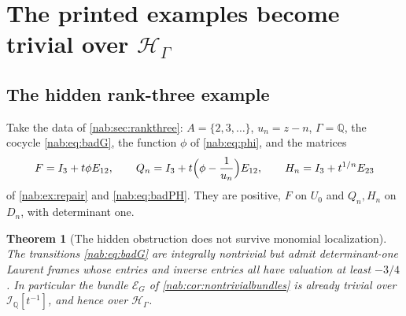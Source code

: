 \documentclass[11pt,letterpaper]{article}
\newtheorem{theorem}{Theorem}[section]
\theoremstyle{definition}
\theoremstyle{remark}
\newcommand{\Q}{\mathbb Q}
\newcommand{\HH}{\mathscr H_\Gamma}
\numberwithin{equation}{section}
\begin{document}
\section{The printed examples become trivial over \texorpdfstring{$\HH$}{H}}
\label{nab:pl:sec:printed}

\subsection{The hidden rank-three example}

Take the data of \cref{nab:sec:rankthree}: $A=\{2,3,\ldots\}$, $u_n=z-n$,
$\Gamma=\Q$, the cocycle \eqref{nab:eq:badG}, the function $\phi$ of
\eqref{nab:eq:phi}, and the matrices
\[
 F=I_3+t\phi E_{12},\qquad
 Q_n=I_3+t\Bigl(\phi-\frac1{u_n}\Bigr)E_{12},\qquad
 H_n=I_3+t^{1/n}E_{23}
\]
of \cref{nab:ex:repair} and \eqref{nab:eq:badPH}. They are positive, $F$ on
$U_0$ and $Q_n,H_n$ on $D_n$, with determinant one.

\begin{theorem}[The hidden obstruction does not survive monomial
localization]\label{nab:pl:thm:rankthree}
The transitions \eqref{nab:eq:badG} are integrally nontrivial but admit
determinant-one Laurent frames whose entries and inverse entries all have
valuation at least $-3/4$. In particular the bundle $\mathcal E_G$ of
\cref{nab:cor:nontrivialbundles} is already trivial over
$\mathscr I_{\Q}[t^{-1}]$, and hence over $\HH$.
\end{theorem}
\end{document}

